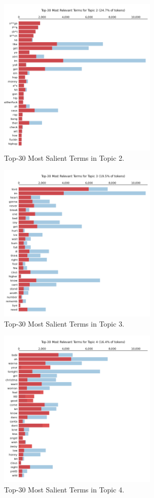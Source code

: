 \begin{center}
\begin{figure}[H]
  \centering
  \includegraphics[width=3in]{img/topics/png/t2.png}
  \caption{Top-30 Most Salient Terms in Topic 2.}
  \label{Figure:fig_eh}
\end{figure}
\end{center}

\begin{center}
\begin{figure}[H]
  \centering
  \includegraphics[width=3in]{img/topics/png/t3.png}
  \caption{Top-30 Most Salient Terms in Topic 3.}
  \label{Figure:fig_eh}
\end{figure}
\end{center}

\begin{center}
\begin{figure}[H]
  \centering
  \includegraphics[width=3in]{img/topics/png/t4.png}
  \caption{Top-30 Most Salient Terms in Topic 4.}
  \label{Figure:fig_eh}
\end{figure}
\end{center}

